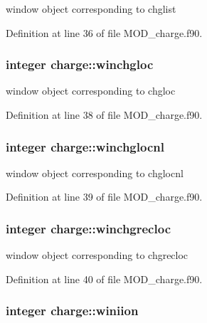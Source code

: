 window object corresponding to chglist 



Definition at line 36 of file M\-O\-D\-\_\-charge.\-f90.

\hypertarget{classcharge_affdd1b084d1cf6c440913d7428e91151}{
\subsubsection[{winchgloc}]{\setlength{\rightskip}{0pt plus 5cm}integer charge\-::winchgloc}}\label{classcharge_affdd1b084d1cf6c440913d7428e91151}


window object corresponding to chgloc 



Definition at line 38 of file M\-O\-D\-\_\-charge.\-f90.

\hypertarget{classcharge_a1df5f2b5c1339473ca4cfc6d80f6272d}{
\subsubsection[{winchglocnl}]{\setlength{\rightskip}{0pt plus 5cm}integer charge\-::winchglocnl}}\label{classcharge_a1df5f2b5c1339473ca4cfc6d80f6272d}


window object corresponding to chglocnl 



Definition at line 39 of file M\-O\-D\-\_\-charge.\-f90.

\hypertarget{classcharge_a7c092558e98218116613e7117e819534}{
\subsubsection[{winchgrecloc}]{\setlength{\rightskip}{0pt plus 5cm}integer charge\-::winchgrecloc}}\label{classcharge_a7c092558e98218116613e7117e819534}


window object corresponding to chgrecloc 



Definition at line 40 of file M\-O\-D\-\_\-charge.\-f90.

\hypertarget{classcharge_a3ff6e830154e3960da488de190bce8eb}{
\subsubsection[{winiion}]{\setlength{\rightskip}{0pt plus 5cm}integer charge\-::winiion}}\label{classcharge_a3ff6e830154e3960da488de190bce8eb}


